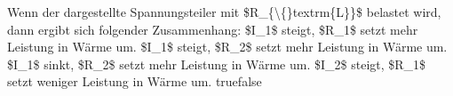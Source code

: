     {Wenn der dargestellte Spannungsteiler mit \$R\_\{\textbackslash\{\}textrm\{L\}\}\$ belastet wird, dann ergibt sich folgender Zusammenhang:}
    {\$I\_1\$ steigt, \$R\_1\$ setzt mehr Leistung in Wärme um.}
    {\$I\_1\$ steigt, \$R\_2\$ setzt mehr Leistung in Wärme um.}
    {\$I\_1\$ sinkt, \$R\_2\$ setzt mehr Leistung in Wärme um.}
    {\$I\_2\$ steigt, \$R\_1\$ setzt weniger Leistung in Wärme um.}
    {true}{false}